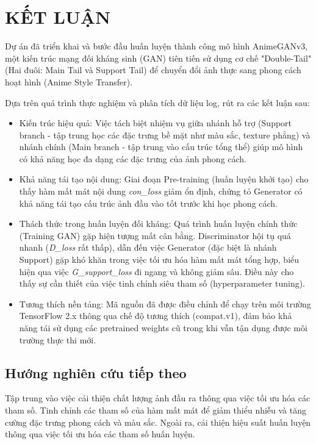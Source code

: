 \clearpage
{}

\chapter*{KẾT LUẬN}

Dự án đã triển khai và bước đầu huấn luyện thành công mô hình AnimeGANv3, một kiến trúc mạng đối 
kháng sinh (GAN) tiên tiến sử dụng cơ chế "Double-Tail" (Hai đuôi: Main Tail và Support Tail) để 
chuyển đổi ảnh thực sang phong cách hoạt hình (Anime Style Transfer).

Dựa trên quá trình thực nghiệm và phân tích dữ liệu log, rút ra các kết luận sau:

\begin{itemize}
    \item Kiến trúc hiệu quả: Việc tách biệt nhiệm vụ giữa nhánh hỗ trợ (Support branch - 
    tập trung học các đặc trưng bề mặt như màu sắc, texture phẳng) và nhánh chính (Main branch - 
    tập trung vào cấu trúc tổng thể) giúp mô hình có khả năng học đa dạng các đặc trưng của ảnh 
    phong cách.
    \item Khả năng tái tạo nội dung: Giai đoạn Pre-training (huấn luyện khởi tạo) cho thấy hàm 
    mất mát nội dung \textit{con\_loss} giảm ổn định, chứng tỏ Generator có khả năng tái tạo cấu trúc ảnh 
    đầu vào tốt trước khi học phong cách.
    \item Thách thức trong huấn luyện đối kháng: Quá trình huấn luyện chính thức (Training GAN) 
    gặp hiện tượng mất cân bằng. Discriminator hội tụ quá nhanh (\textit{D\_loss} rất thấp), dẫn đến việc 
    Generator (đặc biệt là nhánh Support) gặp khó khăn trong việc tối ưu hóa hàm mất mát tổng hợp, 
    biểu hiện qua việc \textit{G\_support\_loss} đi ngang và không giảm sâu. Điều này cho thấy sự cần thiết của 
    việc tinh chỉnh siêu tham số (hyperparameter tuning).
    \item Tương thích nền tảng: Mã nguồn đã được điều chỉnh để chạy trên môi 
    trường TensorFlow 2.x thông qua chế độ tương thích (compat.v1), đảm bảo 
    khả năng tái sử dụng các pretrained weights cũ trong khi vẫn tận dụng được 
    môi trường thực thi mới.
\end{itemize}

\section*{Hướng nghiên cứu tiếp theo}
Tập trung vào việc cải thiện chất lượng ảnh đầu ra thông qua việc tối ưu hóa các tham số.
Tinh chỉnh các tham số của hàm mất mát để giảm thiểu nhiễu và tăng cường đặc trưng phong
cách và màu sắc. Ngoài ra, cải thiện hiệu suất huấn luyện thông qua việc tối ưu hóa các 
tham số huấn luyện.

